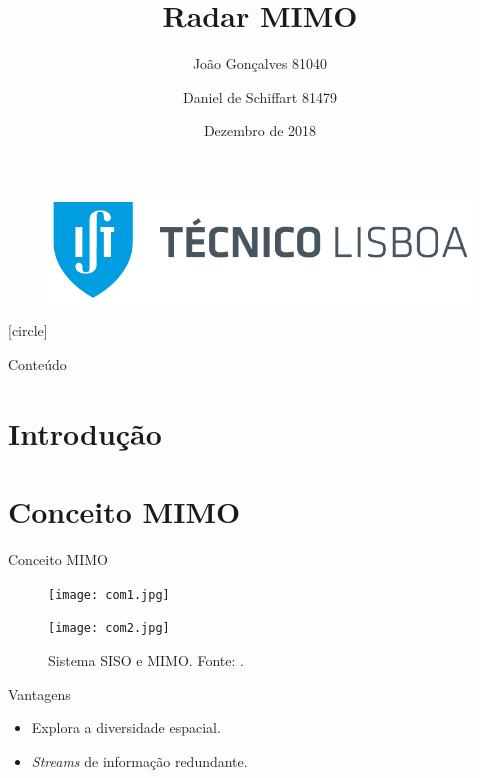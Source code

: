 \documentclass[portuguese]{beamer}
\title[Radar MIMO]{Radar MIMO}
\author[MEAer -- Sistemas de Radar]{
  João Gonçalves 81040 \and Daniel de Schiffart 81479
    }
\institute{Sistemas de Radar}
\date{Dezembro de 2018}
\begin{document}
\begin{frame}
    \begin{figure}
	\includegraphics[width=0.5\linewidth]{graphics/tecnico_logo.png}
    \end{figure}
    \titlepage
\end{frame}
[circle]
\begin{frame}{Conteúdo}
  \tableofcontents
\end{frame}

\section{Introdução}

\section{Conceito MIMO}

\begin{frame}{Conceito MIMO}
  \begin{figure}[]
	\centering
	\begin{minipage}[t]{0.5\linewidth}
	  \centering
	  \texttt{[image: com1.jpg]}
    \end{minipage}%
    \begin{minipage}[t]{0.5\linewidth}	
	  \centering
	  \texttt{[image: com2.jpg]}
    \end{minipage}%
	\caption{Sistema SISO e MIMO. Fonte: \cite{swantennas}.}
	\label{fig:antenas}
  \end{figure}
  Vantagens
  \begin{itemize}
	\item Explora a diversidade espacial.
	\item \textit{Streams} de informação redundante.
  \end{itemize}
\end{frame}
\end{document}
